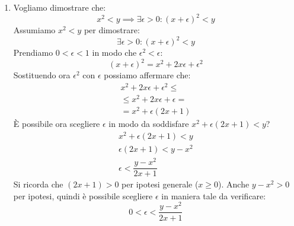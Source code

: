 {\begin{enumerate}[label=(\Alph*)]
        \item Vogliamo dimostrare che:
            \begin{equation*}
                x^2 < y \implies \exists \epsilon > 0: (x + \epsilon)^2 < y
            \end{equation*}
            Assumiamo $x^2 < y$ per dimostrare:
            \begin{equation*}
                \exists \epsilon > 0: (x + \epsilon)^2 < y
            \end{equation*}
            Prendiamo $0 < \epsilon < 1$ in modo che $\epsilon^2 < \epsilon$:
            \begin{equation*}
                (x+\epsilon)^2 = x^2 + 2x\epsilon + \epsilon^2
            \end{equation*}
            Sostituendo ora $\epsilon^2$ con $\epsilon$ possiamo affermare che:
            \begin{gather*}
                x^2 + 2x\epsilon + \epsilon^2 \leq\\
                \leq x^2 + 2x\epsilon + \epsilon =\\
                = x^2 + \epsilon(2x + 1)
            \end{gather*}
            È possibile ora scegliere $\epsilon$ in modo da soddisfare $x^2 + 
            \epsilon(2x + 1) < y$?
            \begin{gather*}
                x^2 + \epsilon(2x + 1) < y\\
                \epsilon(2x + 1) < y - x^2\\
                \epsilon < \dfrac{y-x^2}{2x+1}
            \end{gather*}
            Si ricorda che $(2x+1) > 0$ per ipotesi generale ($x \geq 0$). 
            Anche $y-x^2 > 0$ per ipotesi, quindi è possibile scegliere 
            $\epsilon$ in maniera tale da verificare:
            \begin{equation*}
                0 < \epsilon < \dfrac{y-x^2}{2x+1}
            \end{equation*}


\end{enumerate}}
